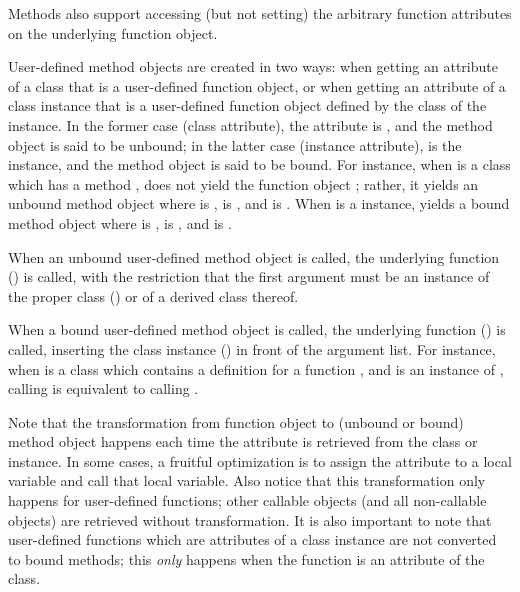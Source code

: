 \begin{description}
\begin{description}
Methods also support accessing (but not setting) the arbitrary
function attributes on the underlying function object.

User-defined method objects are created in two ways: when getting an
attribute of a class that is a user-defined function object, or when
getting an attribute of a class instance that is a user-defined
function object defined by the class of the instance.  In the former
case (class attribute), the  attribute is ,
and the method object is said to be unbound; in the latter case
(instance attribute),  is the instance, and the method
object is said to be bound.  For
instance, when  is a class which has a method
,  does not yield the function object
; rather, it yields an unbound method object  where
 is ,  is , and
 is .  When  is a 
instance,  yields a bound method object  where
 is ,  is , and
 is .

When an unbound user-defined method object is called, the underlying
function () is called, with the restriction that the
first argument must be an instance of the proper class
() or of a derived class thereof.

When a bound user-defined method object is called, the underlying
function () is called, inserting the class instance
() in front of the argument list.  For instance, when
 is a class which contains a definition for a function
, and  is an instance of , calling
 is equivalent to calling .

Note that the transformation from function object to (unbound or
bound) method object happens each time the attribute is retrieved from
the class or instance.  In some cases, a fruitful optimization is to
assign the attribute to a local variable and call that local variable.
Also notice that this transformation only happens for user-defined
functions; other callable objects (and all non-callable objects) are
retrieved without transformation.  It is also important to note that
user-defined functions which are attributes of a class instance are
not converted to bound methods; this \emph{only} happens when the
function is an attribute of the class.


\end{description}
\end{description}
